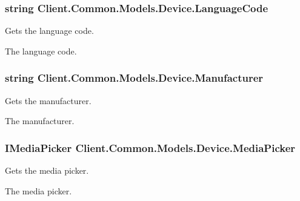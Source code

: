 \subsubsection[{Language\+Code}]{\setlength{\rightskip}{0pt plus 5cm}string Client.\+Common.\+Models.\+Device.\+Language\+Code\hspace{0.3cm}{\ttfamily [get]}}\label{classClient_1_1Common_1_1Models_1_1Device_ac83cd54233e05b757043739f6e82e7f4}


Gets the language code. 

The language code.\hypertarget{classClient_1_1Common_1_1Models_1_1Device_aba04a67247d5964c96429b5088126b99}{}
\subsubsection[{Manufacturer}]{\setlength{\rightskip}{0pt plus 5cm}string Client.\+Common.\+Models.\+Device.\+Manufacturer\hspace{0.3cm}{\ttfamily [get]}}\label{classClient_1_1Common_1_1Models_1_1Device_aba04a67247d5964c96429b5088126b99}


Gets the manufacturer. 

The manufacturer.\hypertarget{classClient_1_1Common_1_1Models_1_1Device_aedfd6cdd3804beb87a78ddca9fc02c66}{}
\subsubsection[{Media\+Picker}]{\setlength{\rightskip}{0pt plus 5cm}I\+Media\+Picker Client.\+Common.\+Models.\+Device.\+Media\+Picker\hspace{0.3cm}{\ttfamily [get]}}\label{classClient_1_1Common_1_1Models_1_1Device_aedfd6cdd3804beb87a78ddca9fc02c66}


Gets the media picker. 

The media picker.\hypertarget{classClient_1_1Common_1_1Models_1_1Device_a6f726201e56a1d46ef8ebd20adf638df}{}

